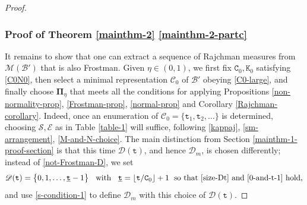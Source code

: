 \documentclass[12pt, twoside]{article}
\theoremstyle{definition}
\numberwithin{equation}{section}
\begin{document}
\begin{proof}
\subsubsection{Proof of Theorem \ref{mainthm-2} \eqref{mainthm-2-partc}}
It remains to show that one can extract a sequence of Rajchman measures from $\mathscr{M}(\mathscr{B}')$ that is also Frostman. Given $\eta \in (0,1)$, we first fix $\mathtt C_0, \mathtt K_0$ satisfying \eqref{C0N0}, then select a minimal representation $\mathscr{C}_0$ of $\mathscr{B}'$ obeying \eqref{C0-large}, and finally choose $\pmb{\Pi}_{\eta}$ that meets all the conditions for applying Propositions \ref{non-normality-prop}, \ref{Frostman-prop}, \ref{normal-prop} and Corollary \ref{Rajchman-corollary}. Indeed, once an enumeration of $\mathscr{C}_0 = \{\mathtt t_1, \mathtt t_2, \ldots \}$ is determined, choosing $\mathcal S, \mathcal E$ as in Table \ref{table-1} will suffice, following \eqref{kappaj}, \eqref{sm-arrangement}, \eqref{M-and-N-choice}. The main distinction from Section \ref{mainthm-1-proof-section} is that this time $\mathscr{D}(\mathtt t)$, and hence $\mathscr{D}_m$, is chosen differently; instead of \eqref{not-Frostman-D}, we set
\[ \mathscr{D}(\mathtt t) = \bigl\{0, 1, \ldots, \underline{\mathtt t}-1 \bigr\} \; \; \text{ with } \; \; \underline{\mathtt t} = \lfloor \mathtt t/\mathtt C_0 \rfloor + 1 \; \text{ so that \eqref{size-Dt} and \eqref{0-and-t-1} hold,}  \]
and use \eqref{s-condition-1} to define $\mathscr{D}_m$ with this choice of $\mathscr{D}(\mathtt t)$.

\end{proof}
\end{document}
